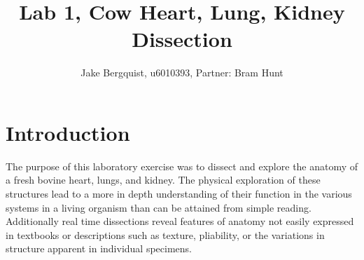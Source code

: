 \documentclass[12pt]{article}
\begin{document}
\title{Lab 1, Cow Heart, Lung, Kidney Dissection}
\author{Jake Bergquist, u6010393, Partner: Bram Hunt}
\maketitle

\section{Introduction}
\par{}
The purpose of this laboratory exercise was to dissect and explore the anatomy of a fresh bovine heart, lungs, and kidney. The physical exploration of these structures lead to a more in depth understanding of their function in the various systems in a living organism than can be attained from simple reading. Additionally real time dissections reveal features of anatomy not easily expressed in textbooks or descriptions such as texture, pliability, or the variations in structure apparent in individual specimens.
\end{document}
